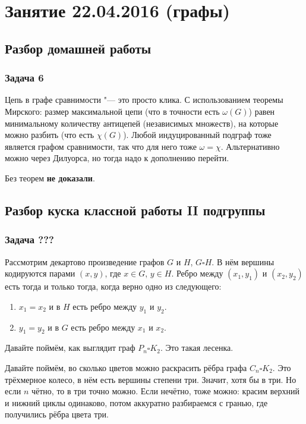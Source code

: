 \chapter{Занятие 22.04.2016 (графы)}

\section{Разбор домашней работы}
\subsection{Задача 6}
	Цепь в графе сравнимости "--- это просто клика.
	С использованием теоремы Мирского: размер максимальной цепи (что в точности есть $\omega(G)$)
	равен минимальному количеству антицепей (независимых множеств), на которые можно разбить (что есть $\chi(G)$).
	Любой индуцированный подграф тоже является графом сравнимости, так что для него тоже $\omega=\chi$.
	Альтернативно можно через Дилуорса, но тогда надо к дополнению перейти.

	Без теорем \textbf{не доказали}.

\section{Разбор куска классной работы II подгруппы}
\subsection{Задача ???}
	Рассмотрим декартово произведение графов $G$ и $H$, $G \square H$.
	В нём вершины кодируются парами $(x, y)$, где $x \in G$, $y \in H$.
	Ребро между $(x_1, y_1)$ и $(x_2, y_2)$ есть тогда и только тогда, когда верно одно из следующего:
	\begin{enumerate}
		\item $x_1=x_2$ и в $H$ есть ребро между $y_1$ и $y_2$.
		\item $y_1=y_2$ и в $G$ есть ребро между $x_1$ и $x_2$.
	\end{enumerate}
	Давайте поймём, как выглядит граф $P_n \square K_2$.
	Это такая лесенка.

	Давайте поймём, во сколько цветов можно раскрасить рёбра графа $C_n \square K_2$.
    Это трёхмерное колесо, в нём есть вершины степени три.
    Значит, хотя бы в три.
	Но если $n$ чётно, то в три точно можно.
	Если нечётно, тоже можно: красим верхний и нижний циклы одинаково, потом аккуратно разбираемся с гранью,
	где получились рёбра цвета три.


